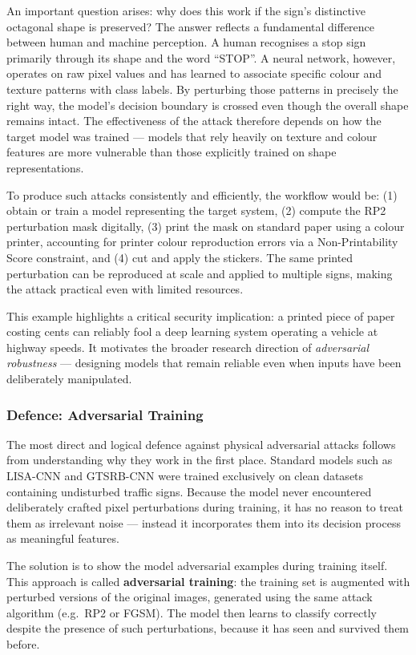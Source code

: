 \documentclass[12pt, a4paper]{article}
\begin{document}
An important question arises: why does this work if the sign's distinctive
octagonal shape is preserved? The answer reflects a fundamental difference
between human and machine perception. A human recognises a stop sign
primarily through its shape and the word ``STOP''. A neural network,
however, operates on raw pixel values and has learned to associate
specific colour and texture patterns with class labels. By perturbing those
patterns in precisely the right way, the model's decision boundary is
crossed even though the overall shape remains intact. The effectiveness of
the attack therefore depends on how the target model was trained — models
that rely heavily on texture and colour features are more vulnerable than
those explicitly trained on shape representations.

To produce such attacks consistently and efficiently, the workflow would be:
(1) obtain or train a model representing the target system,
(2) compute the RP2 perturbation mask digitally,
(3) print the mask on standard paper using a colour printer, accounting for
printer colour reproduction errors via a Non-Printability Score constraint,
and (4) cut and apply the stickers. The same printed perturbation can be
reproduced at scale and applied to multiple signs, making the attack
practical even with limited resources.

This example highlights a critical security implication: a printed piece of
paper costing cents can reliably fool a deep learning system operating a
vehicle at highway speeds. It motivates the broader research direction of
\emph{adversarial robustness} — designing models that remain reliable even
when inputs have been deliberately manipulated.

\subsubsection*{Defence: Adversarial Training}

The most direct and logical defence against physical adversarial attacks
follows from understanding why they work in the first place. Standard models
such as LISA-CNN and GTSRB-CNN were trained exclusively on clean datasets
containing undisturbed traffic signs. Because the model never encountered
deliberately crafted pixel perturbations during training, it has no reason
to treat them as irrelevant noise — instead it incorporates them into its
decision process as meaningful features.

The solution is to show the model adversarial examples during training
itself. This approach is called \textbf{adversarial training}: the training
set is augmented with perturbed versions of the original images, generated
using the same attack algorithm (e.g.\ RP2 or FGSM). The model then learns
to classify correctly despite the presence of such perturbations, because
it has seen and survived them before.
\end{document}
